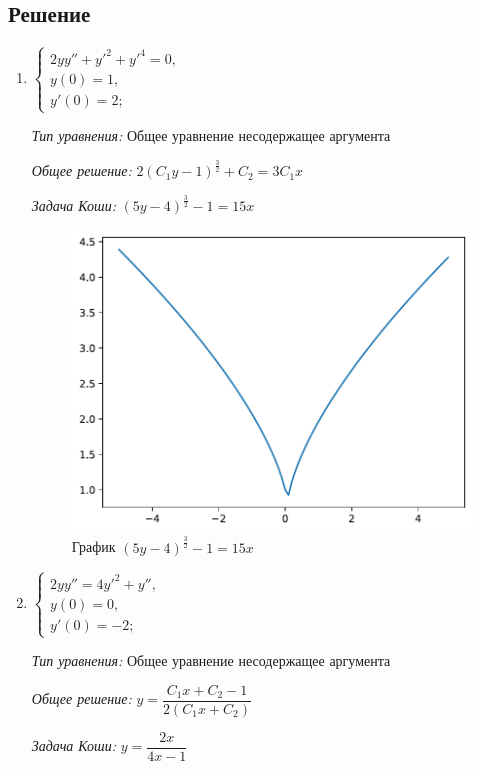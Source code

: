 \documentclass[a4paper, 14pt, fleqn]{extarticle}
\begin{document}
		\subsection{Решение}
			\begin{enumerate}
				\item \(\begin{cases}
						2yy'' + y'^2 + y'^4 = 0, \\
						y(0) = 1, \\
						y'(0) = 2;
					\end{cases}\)

					\textit{Тип уравнения:} Общее уравнение несодержащее аргумента				

					\textit{Общее решение:} \( 2 (C_1y-1)^{\frac{3}{2}} + C_2 = 3C_1x \)
	
					\textit{Задача Коши:} \( (5y-4)^{\frac{3}{2}} - 1 = 15x \)

					\begin{figure}[H]
					   	\centering
					    	\includegraphics[width = .75\linewidth]{1.pdf}
						\caption[.] {График \( (5y-4)^{\frac{3}{2}} - 1 = 15x \)}
  					\end{figure}
			
				\item \(\begin{cases}
						2yy'' = 4y'^2 + y'',\\
						y(0) = 0, \\
						y'(0) = -2;
					\end{cases}\)
					
					\textit{Тип уравнения:} Общее уравнение несодержащее аргумента		

					\textit{Общее решение:} \( y = \dfrac{C_1x+C_2 - 1}{2(C_1x + C_2)} \)
	
					\textit{Задача Коши:} \( y = \dfrac{2x}{4x-1} \)


\end{enumerate}
\end{document}
